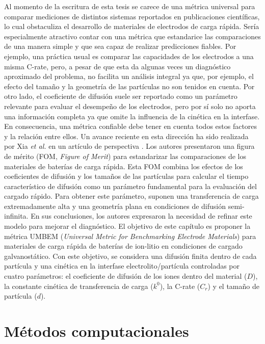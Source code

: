 Al momento de la escritura de esta tesis se carece de una métrica universal 
para comparar mediciones de distintos sistemas reportados en publicaciones
científicas, lo cual obstaculiza el desarrollo de materiales de electrodos de
carga rápida. Sería especialmente atractivo contar con una métrica que 
estandarice las comparaciones de una manera simple y que sea capaz de realizar
predicciones fiables. Por ejemplo, una práctica usual es comparar las 
capacidades de los electrodos a una misma C-rate, pero, a pesar de que esta da algunas
veces un diagnóstico aproximado del problema, no facilita un análisis 
integral ya que, por ejemplo, el efecto del tamaño y la geometría de las 
partículas no son tenidos en cuenta. Por otro lado, el coeficiente de difusión
suele ser reportado como un parámetro relevante para evaluar el desempeño de los electrodos,
pero por sí solo no aporta una información completa ya que omite la 
influencia de la cinética en la interfase. En consecuencia, una métrica confiable 
debe tener en cuenta todos estos factores y la relación entre ellos. Un avance
reciente en esta dirección ha sido realizada por Xia \textit{et al.} 
en un artículo de perspectiva \cite{xia2022}. Los autores presentaron una 
figura de mérito (FOM, \textit{Figure of Merit}) para estandarizar las 
comparaciones de los materiales de baterías de carga rápida. Esta FOM combina
los efectos de los coeficientes de difusión y los tamaños de las partículas 
para calcular el tiempo característico de difusión como un parámetro 
fundamental para la evaluación del cargado rápido. Para obtener este parámetro,
suponen una transferencia de carga extremadamente alta y una geometría plana 
en condiciones de difusión semi-infinita. En sus conclusiones, los autores 
expresaron la necesidad de refinar este modelo para mejorar el diagnóstico. 
El objetivo de este capítulo es proponer la métrica UMBEM (\textit{Universal
Metric for Benchmarking Electrode Materials}) para materiales de carga rápida
de baterías de ion-litio en condiciones de cargado galvanostático. Con este
objetivo, se considera una difusión finita dentro de cada partícula y una cinética en la interfase electrolito/partícula 
controladas por cuatro parámetros: el coeficiente de difusión de los iones 
dentro del material ($D$), la constante cinética de transferencia de carga
($k^0$), la C-rate ($C_r$) y el tamaño de partícula ($d$).


\section{Métodos computacionales}


